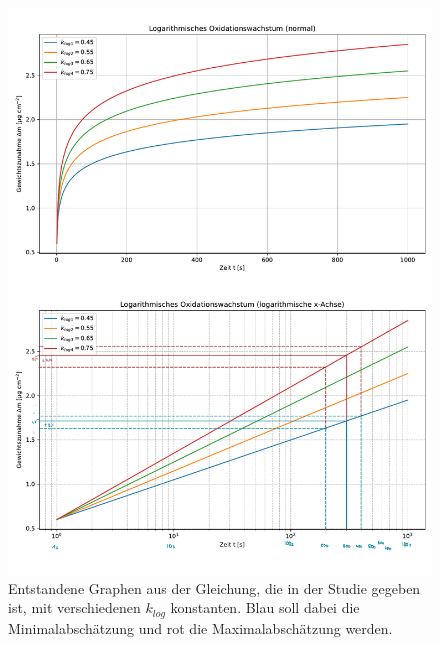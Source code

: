 \onecolumn
\begin{figure}[h!]
    \vspace{1.75cm}
    \includegraphics[width=\textwidth, page=2]{img/21/Plots_oxi-eingezeichnet.pdf}
    \caption{Entstandene Graphen aus der Gleichung, die in der Studie gegeben ist, mit verschiedenen $k_{log}$ konstanten. Blau soll dabei die Minimalabschätzung und rot die Maximalabschätzung werden.}
    \label{fig:log_gezeichnet}
\end{figure}
\twocolumn